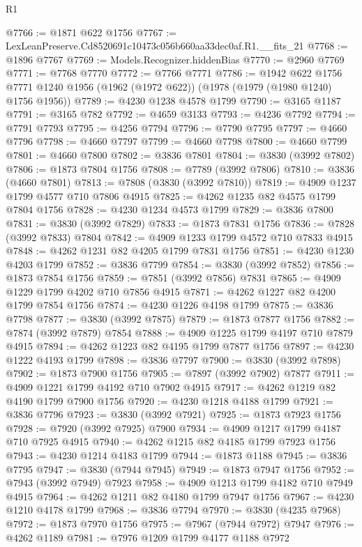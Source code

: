 \begin{lexlean}{R1}
\begin{coremodule}
@7766 := @1871 @622 @1756
@7767 := LexLeanPreserve.Cd8520691c10473c056b660aa33dec0af.R1.__fits_21
@7768 := @1896 @7767
@7769 := Models.Recognizer.hiddenBias
@7770 := @2960 @7769
@7771 := @7768 @7770
@7772 := @7766 @7771
@7786 := @1942
    @622
    @1756
    @7771
    @1240
    @1956
    (@1962 (@1972 @622))
    (@1978 (@1979 (@1980 @1240) @1756 @1956))
@7789 := @4230 @1238 @4578 @1799
@7790 := @3165 @1187
@7791 := @3165 @782
@7792 := @4659 @3133
@7793 := @4236 @7792
@7794 := @7791 @7793
@7795 := @4256 @7794
@7796 := @7790 @7795
@7797 := @4660 @7796
@7798 := @4660 @7797
@7799 := @4660 @7798
@7800 := @4660 @7799
@7801 := @4660 @7800
@7802 := @3836 @7801
@7804 := @3830 (@3992 @7802)
@7806 := @1873 @7804 @1756
@7808 := @7789 (@3992 @7806)
@7810 := @3836 (@4660 @7801)
@7813 := @7808 (@3830 (@3992 @7810))
@7819 := @4909 @1237 @1799 @4577 @710 @7806 @4915
@7825 := @4262 @1235 @82 @4575 @1799 @7804 @1756
@7828 := @4230 @1234 @4573 @1799
@7829 := @3836 @7800
@7831 := @3830 (@3992 @7829)
@7833 := @1873 @7831 @1756
@7836 := @7828 (@3992 @7833) @7804
@7842 := @4909 @1233 @1799 @4572 @710 @7833 @4915
@7848 := @4262 @1231 @82 @4205 @1799 @7831 @1756
@7851 := @4230 @1230 @4203 @1799
@7852 := @3836 @7799
@7854 := @3830 (@3992 @7852)
@7856 := @1873 @7854 @1756
@7859 := @7851 (@3992 @7856) @7831
@7865 := @4909 @1229 @1799 @4202 @710 @7856 @4915
@7871 := @4262 @1227 @82 @4200 @1799 @7854 @1756
@7874 := @4230 @1226 @4198 @1799
@7875 := @3836 @7798
@7877 := @3830 (@3992 @7875)
@7879 := @1873 @7877 @1756
@7882 := @7874 (@3992 @7879) @7854
@7888 := @4909 @1225 @1799 @4197 @710 @7879 @4915
@7894 := @4262 @1223 @82 @4195 @1799 @7877 @1756
@7897 := @4230 @1222 @4193 @1799
@7898 := @3836 @7797
@7900 := @3830 (@3992 @7898)
@7902 := @1873 @7900 @1756
@7905 := @7897 (@3992 @7902) @7877
@7911 := @4909 @1221 @1799 @4192 @710 @7902 @4915
@7917 := @4262 @1219 @82 @4190 @1799 @7900 @1756
@7920 := @4230 @1218 @4188 @1799
@7921 := @3836 @7796
@7923 := @3830 (@3992 @7921)
@7925 := @1873 @7923 @1756
@7928 := @7920 (@3992 @7925) @7900
@7934 := @4909 @1217 @1799 @4187 @710 @7925 @4915
@7940 := @4262 @1215 @82 @4185 @1799 @7923 @1756
@7943 := @4230 @1214 @4183 @1799
@7944 := @1873 @1188
@7945 := @3836 @7795
@7947 := @3830 (@7944 @7945)
@7949 := @1873 @7947 @1756
@7952 := @7943 (@3992 @7949) @7923
@7958 := @4909 @1213 @1799 @4182 @710 @7949 @4915
@7964 := @4262 @1211 @82 @4180 @1799 @7947 @1756
@7967 := @4230 @1210 @4178 @1799
@7968 := @3836 @7794
@7970 := @3830 (@4235 @7968)
@7972 := @1873 @7970 @1756
@7975 := @7967 (@7944 @7972) @7947
@7976 := @4262 @1189
@7981 := @7976 @1209 @1799 @4177 @1188 @7972

\end{coremodule}
\end{lexlean}
